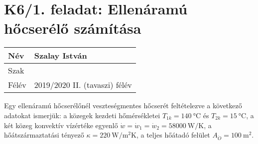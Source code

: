 

\section*{K6/1. feladat: Ellenáramú hőcserélő számítása}

\begin{tabular}{ | p{2cm} | p{14cm} | } 
	\hline
	Név & Szalay István \\ 
	\hline
	Szak & \\ 
	\hline
	Félév & 2019/2020 II. (tavaszi) félév \\ 
	\hline
\end{tabular}
\vspace{0.5cm}

\noindent Egy ellenáramú hőcserélőnél veszteségmentes hőcserét feltételezve a következő adatokat ismerjük: a közegek kezdeti hőmérsékletei $T_{1k} = \SI{140}{\celsius}$ és $T_{2k} = \SI{15}{\celsius}$, a két közeg konvektív vízértéke egyenlő $\dot{w} = \dot{w}_1 = \dot{w}_2 = \SI{58000}{\watt\per\kelvin}$, a hőátszármaztatási tényező $\kappa = \SI{220}{\watt\per\meter\squared\kelvin}$, a teljes hőátadó felület $A_{\ddot{O}} = \SI{100}{\meter\squared}$.

